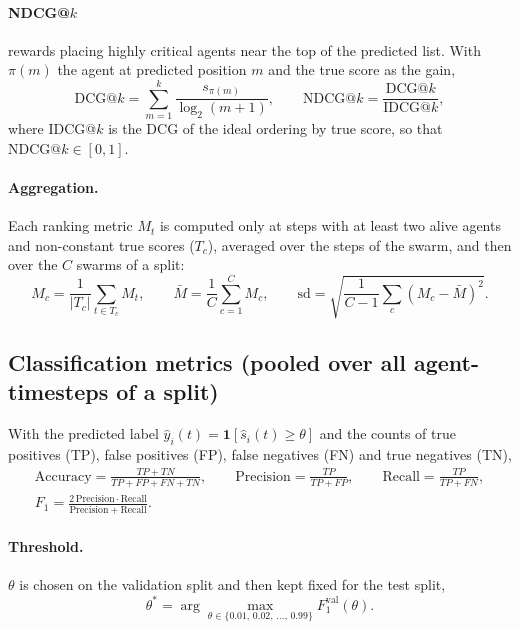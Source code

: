 \documentclass[11pt,a4paper]{article}
\begin{document}
\paragraph{NDCG@$k$} rewards placing highly critical agents near the top of the predicted list. With $\pi(m)$ the agent at predicted
position $m$ and the true score as the gain,
\begin{equation}
\mathrm{DCG@}k=\sum_{m=1}^{k}\frac{s_{\pi(m)}}{\log_2(m+1)},\qquad \mathrm{NDCG@}k=\frac{\mathrm{DCG@}k}{\mathrm{IDCG@}k},
\end{equation}
where IDCG@$k$ is the DCG of the ideal ordering by true score, so that $\mathrm{NDCG@}k\in[0,1]$.

\paragraph{Aggregation.} Each ranking metric $M_t$ is computed only at steps with at least two alive agents and non-constant true scores
($T_c$), averaged over the steps of the swarm, and then over the $C$ swarms of a split:
\begin{equation}
M_c=\frac{1}{|T_c|}\sum_{t\in T_c}M_t,\qquad \bar M=\frac{1}{C}\sum_{c=1}^{C}M_c,\qquad
\mathrm{sd}=\sqrt{\frac{1}{C-1}\sum_{c}(M_c-\bar M)^2}.
\end{equation}

\subsection*{Classification metrics (pooled over all agent-timesteps of a split)}
With the predicted label $\hat y_i(t)=\mathbf{1}[\hat s_i(t)\ge\theta]$ and the counts of true positives (TP), false positives (FP), false
negatives (FN) and true negatives (TN),
\begin{equation}
\begin{gathered}
\mathrm{Accuracy}=\frac{TP+TN}{TP+FP+FN+TN},\qquad
\mathrm{Precision}=\frac{TP}{TP+FP},\qquad
\mathrm{Recall}=\frac{TP}{TP+FN},\\[4pt]
F_1=\frac{2\,\mathrm{Precision}\cdot\mathrm{Recall}}{\mathrm{Precision}+\mathrm{Recall}}.
\end{gathered}
\end{equation}
\paragraph{Threshold.} $\theta$ is chosen on the validation split and then kept fixed for the test split,
\begin{equation}
\theta^\ast=\arg\max_{\theta\in\{0.01,\,0.02,\,\ldots,\,0.99\}}F_1^{\mathrm{val}}(\theta).
\end{equation}
\end{document}
